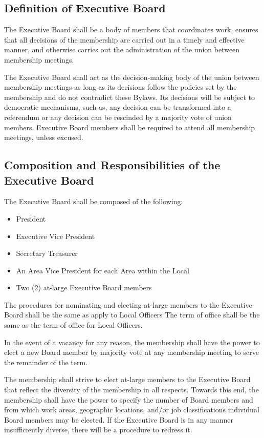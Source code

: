 \documentclass[11pt]{article}
\begin{document}
\subsection{Definition of Executive Board}
The Executive Board shall be a body of members that coordinates work, ensures that all decisions of the membership are carried out in a timely and effective manner, and otherwise carries out the administration of the union between membership meetings.

The Executive Board shall act as the decision-making body of the union between membership meetings as long as its decisions follow the policies set by the membership and do not contradict these Bylaws. Its decisions will be subject to democratic mechanisms, such as, any decision can be transformed into a referendum or any decision can be rescinded by a majority vote of union members. Executive Board members shall be required to attend all membership meetings, unless excused.

\subsection{Composition and Responsibilities of the Executive Board}
The Executive Board shall be composed of the following:

\begin{itemize}
  \item President
  \item Executive Vice President
  \item Secretary Treasurer
  \item An Area Vice President for each Area within the Local
  \item Two (2) at-large Executive Board members
\end{itemize}

The procedures for nominating and electing at-large members to the Executive Board shall be the same as apply to Local Officers The term of office shall be the same as the term of office for Local Officers.

In the event of a vacancy for any reason, the membership shall have the power to elect a new Board member by majority vote at any membership meeting to serve the remainder of the term.

The membership shall strive to elect at-large members to the Executive Board that reflect the diversity of the membership in all respects. Towards this end, the membership shall have the power to specify the number of Board members and from which work areas, geographic locations, and/or job classifications individual Board members may be elected. If the Executive Board is in any manner insufficiently diverse, there will be a procedure to redress it.
\end{document}
